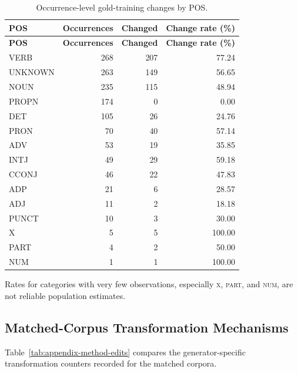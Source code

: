 \documentclass[12pt, a4paper, twoside, openany]{report}
\begin{document}
\begin{longtable}{lrrr}
	\caption{Occurrence-level gold-training changes by POS.}\label{tab:appendix-pos-changes}\\
	\toprule
	\textbf{POS} & \textbf{Occurrences} & \textbf{Changed} & \textbf{Change rate (\%)} \\
	\midrule
	\endfirsthead
	\toprule
	\textbf{POS} & \textbf{Occurrences} & \textbf{Changed} & \textbf{Change rate (\%)} \\
	\midrule
	\endhead
	VERB & 268 & 207 & 77.24 \\
	UNKNOWN & 263 & 149 & 56.65 \\
	NOUN & 235 & 115 & 48.94 \\
	PROPN & 174 & 0 & 0.00 \\
	DET & 105 & 26 & 24.76 \\
	PRON & 70 & 40 & 57.14 \\
	ADV & 53 & 19 & 35.85 \\
	INTJ & 49 & 29 & 59.18 \\
	CCONJ & 46 & 22 & 47.83 \\
	ADP & 21 & 6 & 28.57 \\
	ADJ & 11 & 2 & 18.18 \\
	PUNCT & 10 & 3 & 30.00 \\
	X & 5 & 5 & 100.00 \\
	PART & 4 & 2 & 50.00 \\
	NUM & 1 & 1 & 100.00 \\
	\bottomrule
\end{longtable}

Rates for categories with very few observations, especially \textsc{x}, \textsc{part}, and \textsc{num}, are not reliable population estimates.

\subsection{Matched-Corpus Transformation Mechanisms}

Table~\ref{tab:appendix-method-edits} compares the generator-specific transformation counters recorded for the matched corpora.
\end{document}
